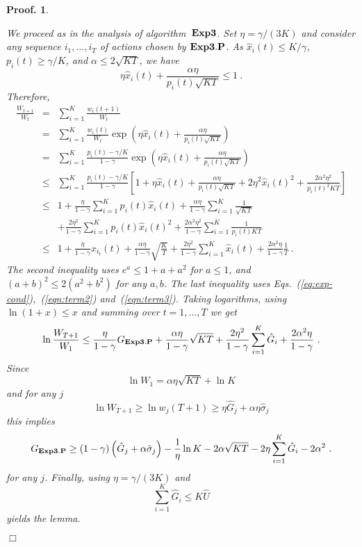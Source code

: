 \documentclass[12pt]{article}
\newcommand{\Aest}{{\bf Exp3}}
\newcommand{\Aesthp}{{\bf Exp3.P}}
\newcommand{\expb}[1]{\exp\left(#1\right)}
\newcommand{\x}[2]{x_{#1}({#2})}
\newcommand{\w}[2]{w_{#1}({#2})}
\renewcommand{\i}[1]{i_{#1}}
\newcommand{\xit}{\x{\i{t}}{t}}
\newcommand{\hU}{\hat{U}}
\newcommand{\p}[2]{p_{#1}(#2)}
\newcommand{\hx}[2]{\hat{x}_{#1}(#2)}
\newtheorem{pproof}{Proof.}
\newenvironment{proof}{
\begin{pproof}
        \begin{rm}\begin{rm}}{
        \hspace*{\fill} $\Box$
        \end{rm}\end{rm}
        \end{pproof}
}
\begin{document}
\begin{proof} We proceed as in the analysis of algorithm~$\Aest$. Set
  $\eta=\gamma/(3K)$ and consider any sequence $i_1,\ldots,i_T$ of
  actions chosen by $\Aesthp$.  As $\hx{i}{t} \leq K/\gamma$,
$\p{i}{t} \geq \gamma/K$, 
and $\alpha \leq 2\sqrt{KT}$, we have
\[
        \eta\hx{i}{t}+\frac{\alpha\eta}{\p{i}{t}\sqrt{KT}} \leq 1~.
\]
Therefore,
\begin{eqnarray*}
\frac{W_{t+1}}{W_{t}} 
& = & \sum_{i=1}^K \frac{\w{i}{t+1}}{W_t} \\
& = & \sum_{i=1}^K \frac{\w{i}{t}}{W_t} 
      \expb{\eta\hx{i}{t}+\frac{\alpha\eta}{\p{i}{t}\sqrt{KT}}} \\
& = & \sum_{i=1}^K \frac{\p{i}{t}-\gamma/K}{1-\gamma}
      \expb{\eta\hx{i}{t}+\frac{\alpha\eta}{\p{i}{t} \sqrt{KT}}}\\
& \leq & \sum_{i=1}^K \frac{\p{i}{t}-\gamma/K}{1-\gamma}
      \left[1 + \eta\hx{i}{t}+\frac{\alpha\eta}{\p{i}{t} \sqrt{KT}}
         + 2\eta^2\hx{i}{t}^2+\frac{2\alpha^2\eta^2}{\p{i}{t}^2 KT} 
         \right] \\
& \leq & 1 
         + \frac{\eta}{1-\gamma} \sum_{i=1}^K \p{i}{t} \hx{i}{t}
         + \frac{\alpha\eta}{1-\gamma} \sum_{i=1}^K
              \frac{1}{\sqrt{KT}} \\ &&
         + \frac{2\eta^2}{1-\gamma} \sum_{i=1}^K \p{i}{t} \hx{i}{t}^2
         + \frac{2\alpha^2\eta^2}{1-\gamma} \sum_{i=1}^K 
                                          \frac{1}{\p{i}{t} KT} \\
& \leq & 1  
         + \frac{\eta}{1-\gamma} \xit
         + \frac{\alpha\eta}{1-\gamma} \sqrt{\frac{K}{T}}
         + \frac{2\eta^2}{1-\gamma} \sum_{i=1}^K \hx{i}{t}
         + \frac{2 \alpha^2\eta}{1-\gamma} \frac{1}{T}~.
\end{eqnarray*}
The second inequality uses $e^a\leq 1+a+a^2$ for $a\leq 1$, and
$(a+b)^2\leq 2(a^2 + b^2)$ for any $a,b$.
The last inequality uses Eqs.~(\ref{eq:exp-cond}),~(\ref{eqn:term2})
and~(\ref{eqn:term3}).
Taking logarithms, using $\ln(1+x)\leq x$
and summing over $t=1,\ldots,T$ we get
\[ \ln \frac{W_{T+1}}{W_1} \leq 
         \frac{\eta}{1-\gamma} G_{\Aesthp}
         + \frac{\alpha\eta}{1-\gamma} \sqrt{KT}
         + \frac{2\eta^2}{1-\gamma} \sum_{i=1}^K \hat{G}_i
         + \frac{2\alpha^2\eta}{1-\gamma}~. \]
Since 
\[ \ln W_1 = \alpha\eta\sqrt{KT} + \ln K \] 
and for any $j$
\[ \ln W_{T+1} \geq \ln \w{j}{T+1} 
   \geq \eta \hat{G}_j + \alpha\eta\hat{\sigma}_j \]
this implies
\[
G_{\Aesthp} \geq (1-\gamma)\left(\hat{G}_j + \alpha\hat{\sigma}_j\right)
         - \frac{1}{\eta}\ln K
     - 2\alpha\sqrt{KT}
     - 2\eta\sum_{i=1}^K \hat{G}_i
     - 2 \alpha^2~. 
\]
for any $j$. Finally, using $\eta=\gamma/(3K)$ and
\[
        \sum_{i=1}^K \hat{G}_i \leq K\hU
\]
yields the lemma.
\end{proof}
\end{document}
